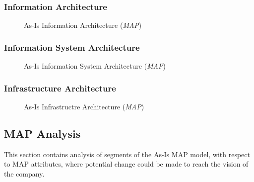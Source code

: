 \subsubsection{Information Architecture}
\begin{center}
	\begin{figure}[H]
		\centering
		\setlength\fboxsep{7pt}
		\setlength\fboxrule{0.5pt}
		\caption{As-Is Information Architecture (\emph{MAP})}
		\label{fig:map_application_as_is}
	\end{figure}
\end{center}
%
\subsubsection{Information System Architecture}
\begin{center}
	\begin{figure}[H]
		\centering
		\setlength\fboxsep{7pt}
		\setlength\fboxrule{0.5pt}
		\caption{As-Is Information System Architecture (\emph{MAP})}
		\label{fig:map_information_as_is}
	\end{figure}
\end{center}
%
\subsubsection{Infrastructure Architecture}
\begin{center}
	\begin{figure}[H]
		\centering
		\setlength\fboxsep{7pt}
		\setlength\fboxrule{0.5pt}
		\caption{As-Is Infrastructre Architecture (\emph{MAP})}
		\label{fig:map_information_as_is}
	\end{figure}
\end{center}
\subsection{MAP Analysis}
\label{sec:map_analysis}
This section contains analysis of segments of the As-Is MAP model, with respect to MAP attributes, where potential change could be made to reach the vision of the company.

